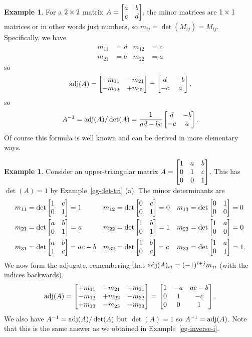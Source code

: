 \documentclass[reqno]{amsart}
\theoremstyle{definition}
\newtheorem{example}[theorem]{Example}
\begin{document}
\begin{example}\label{eg-adjugate-two}
 For a $2\times 2$ matrix $A=\left[\begin{matrix} a&b\\ c&d\end{matrix}\right]$, the minor matrices are
 $1\times 1$ matrices or in other words just numbers, so
 $m_{ij}=\det(M_{ij})=M_{ij}$.  Specifically, we have
 \begin{align*}
  m_{11} &= d & m_{12} &= c \\
  m_{21} &= b & m_{22} &= a
 \end{align*}
 so 
 \[ \operatorname{adj}(A) = \left[\begin{matrix} +m_{11} & -m_{21} \\ -m_{12} & +m_{22}\end{matrix}\right]
     = \left[\begin{matrix} d & -b \\ -c & a \end{matrix}\right],
 \]
 so 
 \[ A^{-1} = 
     \operatorname{adj}(A)/\det(A) = 
      \frac{1}{ad-bc} \left[\begin{matrix} d & -b \\ -c & a \end{matrix}\right].
 \]
 Of course this formula is well known and can be derived in more
 elementary ways.
\end{example}

\begin{example}\label{eg-adjugate-tri}
 Consider an upper-triangular matrix
 $A=\left[\begin{matrix} 1&a&b \\
         0&1&c \\
         0&0&1\end{matrix}\right]$.
 This has $\det(A)=1$ by Example~\ref{eg-det-tri} (a).  The minor
 determinants are
 \begin{align*}
  m_{11} &= \det\left[\begin{matrix} 1&c\\0&1\end{matrix}\right] = 1 &
  m_{12} &= \det\left[\begin{matrix} 0&c\\0&1\end{matrix}\right] = 0 &
  m_{13} &= \det\left[\begin{matrix} 0&1\\0&0\end{matrix}\right] = 0 \\
  m_{21} &= \det\left[\begin{matrix} a&b\\0&1\end{matrix}\right] = a &
  m_{22} &= \det\left[\begin{matrix} 1&b\\0&1\end{matrix}\right] = 1 &
  m_{23} &= \det\left[\begin{matrix} 1&a\\0&0\end{matrix}\right] = 0 \\
  m_{31} &= \det\left[\begin{matrix} a&b\\1&c\end{matrix}\right] = ac-b &
  m_{32} &= \det\left[\begin{matrix} 1&b\\0&c\end{matrix}\right] = c &
  m_{33} &= \det\left[\begin{matrix} 1&a\\0&1\end{matrix}\right] = 1.
 \end{align*}
 We now form the adjugate, remembering that
 $\operatorname{adj}(A)_{ij}=(-1)^{i+j}m_{ji}$ (with the indices backwards).
 \[
   \operatorname{adj}(A) =
   \left[\begin{matrix} +m_{11} & -m_{21} & +m_{31} \\
        -m_{12} & +m_{22} & -m_{32} \\
        +m_{13} & -m_{23} & +m_{33}
   \end{matrix}\right]
   =
   \left[\begin{matrix}
    1 & -a & ac-b \\ 0 & 1 & -c \\ 0 & 0 & 1
   \end{matrix}\right].
 \]
 We also have $A^{-1}=\operatorname{adj}(A)/\det(A)$ but $\det(A)=1$ so
 $A^{-1}=\operatorname{adj}(A)$.  Note that this is the same answer as we obtained
 in Example~\ref{eg-inverse-i}.
\end{example}
\end{document}

